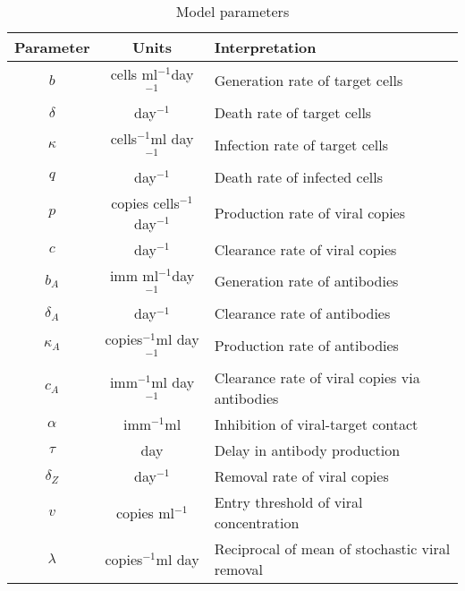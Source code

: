 \documentclass[11pt]{article}
\newcommand{\iv}{$^{-1}$}
\begin{document}
    \begin{table}[h!]
        \centering
        \caption{Model parameters}
        \vspace{1em}
        \begin{tabular}{ccl} \hline\hline
            Parameter   & Units     & Interpretation \\\hline\hline
            $b$         & cells ml\iv day\iv
                                    & Generation rate of target cells \\
            $\delta$    & day\iv
                                    & Death rate of target cells \\
            $\kappa$    & cells\iv ml day\iv
                                    & Infection rate of target cells \\
            $q$         & day\iv
                                    & Death rate of infected cells \\
            $p$         & copies cells\iv day\iv
                                    & Production rate of viral copies \\
            $c$         & day\iv
                                    & Clearance rate of viral copies \\
            $b_A$       & imm ml\iv day\iv
                                    & Generation rate of antibodies \\
            $\delta_A$  & day\iv
                                    & Clearance rate of antibodies \\
            $\kappa_A$  & copies\iv ml day\iv
                                    & Production rate of antibodies \\
            $c_A$       & imm\iv ml day\iv
                                    & Clearance rate of viral copies via antibodies \\
            $\alpha$    & imm\iv ml
                                    & Inhibition of viral-target contact \\
            $\tau$      & day
                                    & Delay in antibody production \\
            $\delta_Z$  & day\iv
                                    & Removal rate of viral copies \\
            $v$         & copies ml\iv
                                    & Entry threshold of viral concentration \\
            $\lambda$   & copies\iv ml day
                                    & Reciprocal of mean of stochastic viral removal \\

\end{tabular}
\end{table}
\end{document}
